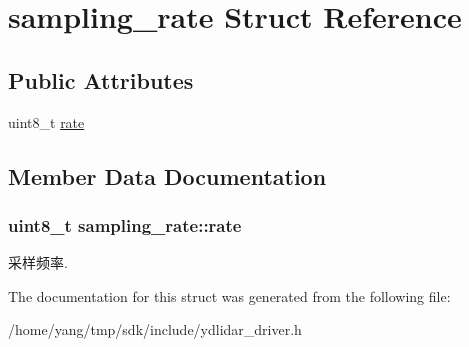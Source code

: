 \hypertarget{structsampling__rate}{}\section{sampling\+\_\+rate Struct Reference}
\label{structsampling__rate}
\subsection*{Public Attributes}
\begin{DoxyCompactItemize}
\item 
uint8\+\_\+t \hyperlink{structsampling__rate_a8d860fbedd930d2022fe7bb6cf1f78b6}{rate}
\end{DoxyCompactItemize}


\subsection{Member Data Documentation}
\subsubsection[{\texorpdfstring{rate}{rate}}]{\setlength{\rightskip}{0pt plus 5cm}uint8\+\_\+t sampling\+\_\+rate\+::rate}\hypertarget{structsampling__rate_a8d860fbedd930d2022fe7bb6cf1f78b6}{}\label{structsampling__rate_a8d860fbedd930d2022fe7bb6cf1f78b6}
采样频率. 

The documentation for this struct was generated from the following file\+:\begin{DoxyCompactItemize}
\item 
/home/yang/tmp/sdk/include/ydlidar\+\_\+driver.\+h\end{DoxyCompactItemize}
